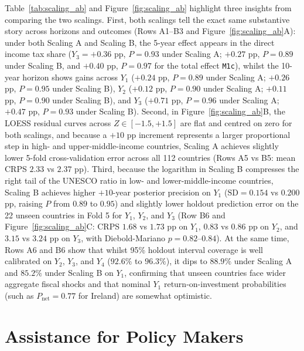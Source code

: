 \documentclass[11pt,a4paper]{article}
\begin{document}
Table~\ref{tab:scaling_ab} and Figure~\ref{fig:scaling_ab} highlight three insights from comparing the two scalings. First, both scalings tell the exact same substantive story across horizons and outcomes (Rows A1--B3 and Figure~\ref{fig:scaling_ab}A): under both Scaling A and Scaling B, the 5-year effect appears in the direct income tax share ($Y_3 = +0.36$ pp, $P = 0.93$ under Scaling A; $+0.27$ pp, $P = 0.89$ under Scaling B, and $+0.40$ pp, $P = 0.97$ for the total effect \texttt{M1c}), whilst the 10-year horizon shows gains across $Y_1$ ($+0.24$ pp, $P = 0.89$ under Scaling A; $+0.26$ pp, $P = 0.95$ under Scaling B), $Y_2$ ($+0.12$ pp, $P = 0.90$ under Scaling A; $+0.11$ pp, $P = 0.90$ under Scaling B), and $Y_3$ ($+0.71$ pp, $P = 0.96$ under Scaling A; $+0.47$ pp, $P = 0.93$ under Scaling B). Second, in Figure~\ref{fig:scaling_ab}B, the LOESS residual curves across $Z \in [-1.5, +1.5]$ are flat and centred on zero for both scalings, and because a $+10$ pp increment represents a larger proportional step in high- and upper-middle-income countries, Scaling A achieves slightly lower 5-fold cross-validation error across all 112 countries (Rows A5 vs B5: mean CRPS $2.33$ vs $2.37$ pp). Third, because the logarithm in Scaling B compresses the right tail of the UNESCO ratio in low- and lower-middle-income countries, Scaling B achieves higher $+10$-year posterior precision on $Y_1$ ($\text{SD} = 0.154$ vs $0.200$ pp, raising $P$ from $0.89$ to $0.95$) and slightly lower holdout prediction error on the 22 unseen countries in Fold 5 for $Y_1$, $Y_2$, and $Y_3$ (Row B6 and Figure~\ref{fig:scaling_ab}C: CRPS $1.68$ vs $1.73$ pp on $Y_1$, $0.83$ vs $0.86$ pp on $Y_2$, and $3.15$ vs $3.24$ pp on $Y_3$, with Diebold-Mariano $p = 0.82\text{--}0.84$). At the same time, Rows A6 and B6 show that whilst 95\% holdout interval coverage is well calibrated on $Y_2$, $Y_3$, and $Y_4$ ($92.6\%$ to $96.3\%$), it dips to $88.9\%$ under Scaling A and $85.2\%$ under Scaling B on $Y_1$, confirming that unseen countries face wider aggregate fiscal shocks and that nominal $Y_1$ return-on-investment probabilities (such as $P_{\text{net}} = 0.77$ for Ireland) are somewhat optimistic.

\section{Assistance for Policy Makers}
\label{app:policymakers}
\end{document}
